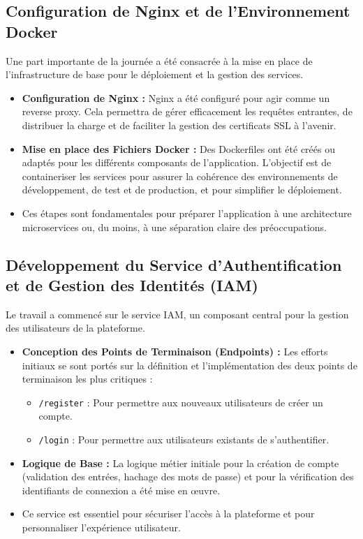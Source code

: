 \documentclass[12pt, a4paper]{article}
\begin{document}
\subsection{Configuration de Nginx et de l'Environnement Docker}
Une part importante de la journée a été consacrée à la mise en place de l'infrastructure de base pour le déploiement et la gestion des services.
\begin{itemize}
    \item \textbf{Configuration de Nginx :} Nginx a été configuré pour agir comme un reverse proxy. Cela permettra de gérer efficacement les requêtes entrantes, de distribuer la charge et de faciliter la gestion des certificats SSL à l'avenir.
    \item \textbf{Mise en place des Fichiers Docker :} Des Dockerfiles ont été créés ou adaptés pour les différents composants de l'application. L'objectif est de containeriser les services pour assurer la cohérence des environnements de développement, de test et de production, et pour simplifier le déploiement.
    \item Ces étapes sont fondamentales pour préparer l'application à une architecture microservices ou, du moins, à une séparation claire des préoccupations.
\end{itemize}

\subsection{Développement du Service d'Authentification et de Gestion des Identités (IAM)}
Le travail a commencé sur le service IAM, un composant central pour la gestion des utilisateurs de la plateforme.
\begin{itemize}
    \item \textbf{Conception des Points de Terminaison (Endpoints) :} Les efforts initiaux se sont portés sur la définition et l'implémentation des deux points de terminaison les plus critiques :
    \begin{itemize}
        \item \texttt{/register} : Pour permettre aux nouveaux utilisateurs de créer un compte.
        \item \texttt{/login} : Pour permettre aux utilisateurs existants de s'authentifier.
    \end{itemize}
    \item \textbf{Logique de Base :} La logique métier initiale pour la création de compte (validation des entrées, hachage des mots de passe) et pour la vérification des identifiants de connexion a été mise en œuvre.
    \item Ce service est essentiel pour sécuriser l'accès à la plateforme et pour personnaliser l'expérience utilisateur.
\end{itemize}
\end{document}
